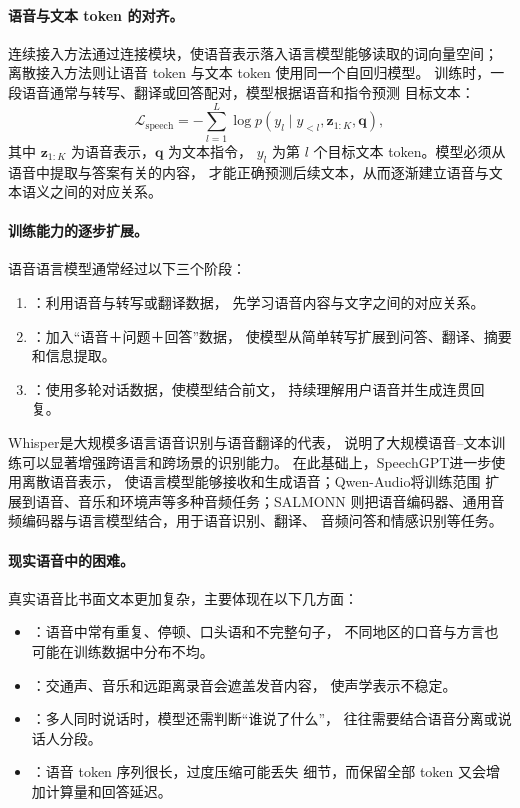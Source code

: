 \paragraph{语音与文本 token 的对齐。}
连续接入方法通过连接模块，使语音表示落入语言模型能够读取的词向量空间；
离散接入方法则让语音 token 与文本 token 使用同一个自回归模型。
训练时，一段语音通常与转写、翻译或回答配对，模型根据语音和指令预测
目标文本：
\begin{equation}
  \mathcal{L}_{\mathrm{speech}}
  =
  -\sum_{l=1}^{L}
  \log p\left(
    y_l
    \mid
    y_{<l},
    \mathbf{z}_{1:K},
    \mathbf{q}
  \right),
\end{equation}
其中 $\mathbf{z}_{1:K}$ 为语音表示，$\mathbf{q}$ 为文本指令，
$y_l$ 为第 $l$ 个目标文本 token。模型必须从语音中提取与答案有关的内容，
才能正确预测后续文本，从而逐渐建立语音与文本语义之间的对应关系。


\paragraph{训练能力的逐步扩展。}
语音语言模型通常经过以下三个阶段：

\begin{enumerate}
  \item {}：利用语音与转写或翻译数据，
  先学习语音内容与文字之间的对应关系。

  \item {}：加入“语音＋问题＋回答”数据，
  使模型从简单转写扩展到问答、翻译、摘要和信息提取。

  \item {}：使用多轮对话数据，使模型结合前文，
  持续理解用户语音并生成连贯回复。
\end{enumerate}

Whisper\cite{whisper}是大规模多语言语音识别与语音翻译的代表，
说明了大规模语音--文本训练可以显著增强跨语言和跨场景的识别能力。
在此基础上，SpeechGPT\cite{speechgpt}进一步使用离散语音表示，
使语言模型能够接收和生成语音；Qwen-Audio\cite{qwenaudio}将训练范围
扩展到语音、音乐和环境声等多种音频任务；SALMONN\cite{salmonn}
则把语音编码器、通用音频编码器与语言模型结合，用于语音识别、翻译、
音频问答和情感识别等任务。


\paragraph{现实语音中的困难。}
真实语音比书面文本更加复杂，主要体现在以下几方面：

\begin{itemize}
  \item {}：语音中常有重复、停顿、口头语和不完整句子，
  不同地区的口音与方言也可能在训练数据中分布不均。
  \item {}：交通声、音乐和远距离录音会遮盖发音内容，
  使声学表示不稳定。
  \item {}：多人同时说话时，模型还需判断“谁说了什么”，
  往往需要结合语音分离或说话人分段。
  \item {}：语音 token 序列很长，过度压缩可能丢失
  细节，而保留全部 token 又会增加计算量和回答延迟。
\end{itemize}

